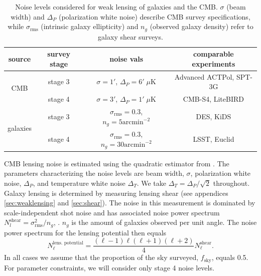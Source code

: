 \documentclass[11pt]{article} %
\begin{document}
\begin{table}[h!]
    \centering
    \begin{tabular}{|c|c|c|c|}
    \hline
    \textbf{source} & \textbf{survey stage} & \textbf{noise vals} & \textbf{comparable experiments} \\
    \hline 
    \multirow{2}{*}{CMB} 
        & stage 3 & $\sigma = 1'$, $\Delta_P = 6' \; \mu \text{K}$ & Advanced ACTPol, SPT-3G \\
    \cline{2-4}
        & stage 4 & $\sigma = 3'$, $\Delta_P = 1' \; \mu \text{K}$ & CMB-S4, LiteBIRD \\
    \hline
    \multirow{2}{*}{galaxies} 
        & stage 3 & $\sigma_{\text{rms}} = 0.3$, $n_g = 5 \text{arcmin}^{-2}$ & DES, KiDS \\
    \cline{2-4}
        & stage 4 & $\sigma_{\text{rms}} = 0.3$, $n_g = 30 \text{arcmin}^{-2}$ & LSST, Euclid \\
    \hline
    \end{tabular}
    \caption{Noise levels considered for weak lensing of galaxies and the CMB. $\sigma$ (beam width) and $\Delta_P$ (polarization white noise) describe CMB survey specifications, while $\sigma_{\text{rms}}$ (intrinsic galaxy ellipticity) and $n_g$ (observed galaxy density) refer to galaxy shear surveys.}
    \label{tab:noiselevels}
\end{table}

CMB lensing noise is estimated using the quadratic estimator from \cite{cmblensingestimator}.
The parameters characterizing the noise levels are beam width, $\sigma$, polarization white noise, $\Delta_P$, and temperature white noise $\Delta_T$. We take $\Delta_T = \Delta_P / \sqrt 2$ throughout. Galaxy lensing is determined by measuring lensing shear (see appendices \ref{sec:weaklensing} and \ref{sec:shear}). The noise in this measurement is dominated by scale-independent shot noise and has associated noise power spectrum $N_l^{\text{shear}} = \sigma_{\text{rms}}^2 / n_g$, \cite{bartelmann2001weak}. $n_g$ is the amount of galaxies observed per unit angle. The noise power spectrum for the lensing potential then equals
\begin{equation*}
    N_\ell^{\text{lens. potential}} = \frac{(\ell-1)\ell(\ell+1)(\ell+2)}{4}N_\ell^{\text{shear}}.
\end{equation*}
In all cases we assume that the proportion of the sky surveyed, $f_{\text{sky}}$, equals 0.5.
For parameter constraints, we will consider only stage 4 noise levels.
\end{document}
